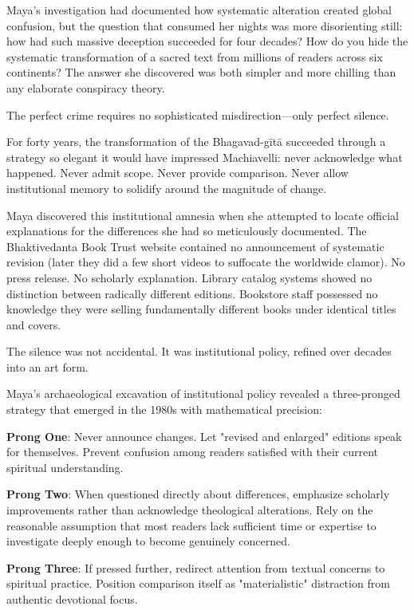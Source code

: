 \documentclass[12pt,twoside]{book}
\begin{document}
\normalfont\justifying
Maya's investigation had documented how systematic alteration created global confusion, but the question that consumed her nights was more disorienting still: how had such massive deception succeeded for four decades? How do you hide the systematic transformation of a sacred text from millions of readers across six continents? The answer she discovered was both simpler and more chilling than any elaborate conspiracy theory.

The perfect crime requires no sophisticated misdirection—only perfect silence.

For forty years, the transformation of the Bhagavad-gītā succeeded through a strategy so elegant it would have impressed Machiavelli: never acknowledge what happened. Never admit scope. Never provide comparison. Never allow institutional memory to solidify around the magnitude of change.

Maya discovered this institutional amnesia when she attempted to locate official explanations for the differences she had so meticulously documented. The Bhaktivedanta Book Trust website contained no announcement of systematic revision (later they did a few short videos to suffocate the worldwide clamor). No press release. No scholarly explanation. Library catalog systems showed no distinction between radically different editions. Bookstore staff possessed no knowledge they were selling fundamentally different books under identical titles and covers.

The silence was not accidental. It was institutional policy, refined over decades into an art form.

Maya's archaeological excavation of institutional policy revealed a three-pronged strategy that emerged in the 1980s with mathematical precision:

\textbf{\textbf{Prong One}}: Never announce changes. Let "revised and enlarged" editions speak for themselves. Prevent confusion among readers satisfied with their current spiritual understanding.

\textbf{\textbf{Prong Two}}: When questioned directly about differences, emphasize scholarly improvements rather than acknowledge theological alterations. Rely on the reasonable assumption that most readers lack sufficient time or expertise to investigate deeply enough to become genuinely concerned.

\textbf{\textbf{Prong Three}}: If pressed further, redirect attention from textual concerns to spiritual practice. Position comparison itself as "materialistic" distraction from authentic devotional focus.
\end{document}
